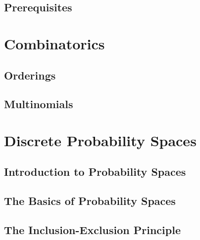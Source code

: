 \documentclass[10pt]{article}
\begin{document}

\tableofcontents

\clearpage

\pagestyle{fancy}

\subsection{Prerequisites}



\newpage
\section{Combinatorics}
\subsection{Orderings}



\newpage
\subsection{Multinomials}



\newpage
\section{Discrete Probability Spaces}

\subsection{Introduction to Probability Spaces}


\newpage
\subsection{The Basics of Probability Spaces}


\newpage
\subsection{The Inclusion-Exclusion Principle}

\end{document}
